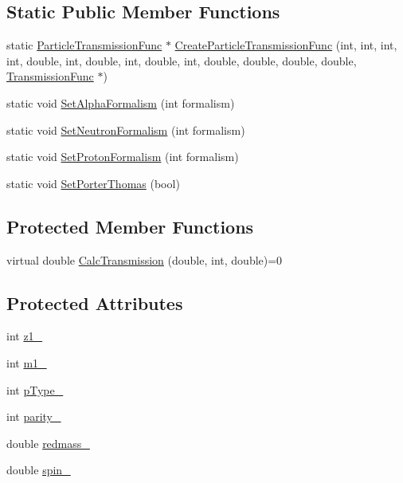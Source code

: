 \subsection*{Static Public Member Functions}
\begin{DoxyCompactItemize}
\item 
static \hyperlink{classParticleTransmissionFunc}{Particle\-Transmission\-Func} $\ast$ \hyperlink{classParticleTransmissionFunc_a4293d27b31c6c32440483991b5dc5d23}{Create\-Particle\-Transmission\-Func} (int, int, int, int, double, int, double, int, double, int, double, double, double, double, \hyperlink{classTransmissionFunc}{Transmission\-Func} $\ast$)
\item 
static void \hyperlink{classParticleTransmissionFunc_a290c59558c005ef083796f2be9ee0edb}{Set\-Alpha\-Formalism} (int formalism)
\item 
static void \hyperlink{classParticleTransmissionFunc_aa4efea43e44552f5fdfc70b2203835af}{Set\-Neutron\-Formalism} (int formalism)
\item 
static void \hyperlink{classParticleTransmissionFunc_ad47eb7569638e7fec2af930bb624185b}{Set\-Proton\-Formalism} (int formalism)
\item 
static void \hyperlink{classParticleTransmissionFunc_a7a98d5b6d04b3fa31cc06e49bbcdf9f3}{Set\-Porter\-Thomas} (bool)
\end{DoxyCompactItemize}
\subsection*{Protected Member Functions}
\begin{DoxyCompactItemize}
\item 
virtual double \hyperlink{classParticleTransmissionFunc_a651cc8a1d96d72e12eaf66506c046856}{Calc\-Transmission} (double, int, double)=0
\end{DoxyCompactItemize}
\subsection*{Protected Attributes}
\begin{DoxyCompactItemize}
\item 
int \hyperlink{classParticleTransmissionFunc_a4c11b86051f613e37b10c692ea9746ce}{z1\-\_\-}
\item 
int \hyperlink{classParticleTransmissionFunc_ac63f83f460c222601d628856ed409a2b}{m1\-\_\-}
\item 
int \hyperlink{classParticleTransmissionFunc_a7d9ec139d40906290a13716e56412e23}{p\-Type\-\_\-}
\item 
int \hyperlink{classParticleTransmissionFunc_a3b5220600e09eeaec5bd1059fa1bd6b3}{parity\-\_\-}
\item 
double \hyperlink{classParticleTransmissionFunc_aa044907ae1f3827d8602fc33f4b0e92c}{redmass\-\_\-}
\item 
double \hyperlink{classParticleTransmissionFunc_a3143aef2c113158fca1643a2505f0b9a}{spin\-\_\-}
\end{DoxyCompactItemize}


